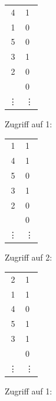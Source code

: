 \begin{enumerate}[a)]
\begin{solution}
\begin{minipage}{0.22\textwidth}
        \begin{tabular}{ | c | l}
        	\cline{1-1}
        	4      & 1      \\ \cline{1-1}
        	1      & 0      \\ \cline{1-1}
        	5      & 0      \\ \cline{1-1}
        	3      & 1      \\ \cline{1-1}
        	2      & 0      \\ \cline{1-1}
        	       & 0      \\ \cline{1-1}
        	\vdots & \vdots \\ \cline{1-1}
        \end{tabular}
    \end{minipage}

    \begin{minipage}{0.28\textwidth}
        \center
        Zugriff auf 1:

        \begin{tabular}{ | c | l}
        	\cline{1-1}
        	1      & 1      \\ \cline{1-1}
        	4      & 1      \\ \cline{1-1}
        	5      & 0      \\ \cline{1-1}
        	3      & 1      \\ \cline{1-1}
        	2      & 0      \\ \cline{1-1}
        	       & 0      \\ \cline{1-1}
        	\vdots & \vdots \\ \cline{1-1}
        \end{tabular}
    \end{minipage}
    \begin{minipage}{0.22\textwidth}
        \center
        Zugriff auf 2:

        \begin{tabular}{ | c | l}
        	\cline{1-1}
        	2      & 1      \\ \cline{1-1}
        	1      & 1      \\ \cline{1-1}
        	4      & 0      \\ \cline{1-1}
        	5      & 1      \\ \cline{1-1}
        	3      & 1      \\ \cline{1-1}
        	       & 0      \\ \cline{1-1}
        	\vdots & \vdots \\ \cline{1-1}
        \end{tabular}
    \end{minipage}
    \begin{minipage}{0.22\textwidth}
        \center
        Zugriff auf 1:


\end{minipage}
\end{solution}
\end{enumerate}
